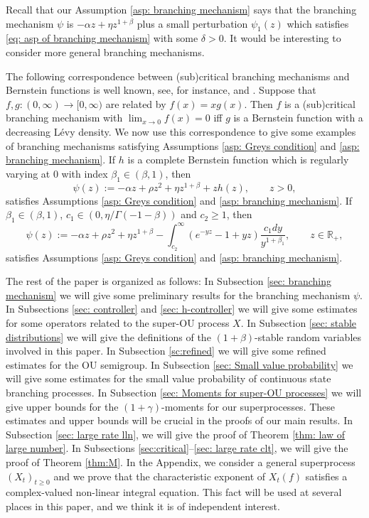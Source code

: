 \documentclass[EJP]{ejpecp} %
\begin{document}
	Recall that our Assumption \ref{asp: branching mechanism} says that the branching mechanism $\psi$ is $-\alpha z +\eta z^{1+\beta}$ plus a small perturbation $\psi_1(z)$ which satisfies \eqref{eq: asp of branching mechanism} with some $\delta>0$.
	It would be interesting to consider more general branching mechanisms.

	The following correspondence between (sub)critical branching mechanisms and Bernstein functions is well known, see, for instance, \cite[Theorem VII.4(ii)]{Bertoin} and \cite[Proposition 7]{BRY}.
	Suppose that $f, g:(0, \infty)\to [0, \infty)$ are related by $f(x)=xg(x)$.
	Then $f$ is a (sub)critical branching mechanism with $\lim_{x\to 0}f(x)=0$ iff $g$ is a Bernstein function with a decreasing L\'evy density.
	We now use this correspondence to give some examples of branching mechanisms satisfying Assumptions \ref{asp: Greys condition} and \ref{asp: branching mechanism}.
	If $h$ is a complete Bernstein function which is regularly varying at 0 with index $\beta_1\in (\beta, 1)$, then
\[
  	\psi(z)
  	:= -\alpha z + \rho z^2+\eta z^{1+\beta}+zh(z),
  	\qquad z>0,
\]
	satisfies Assumptions \ref{asp: Greys condition} and \ref{asp: branching mechanism}.
	If $\beta_1\in (\beta, 1)$, $c_1\in (0, \eta/\Gamma(-1-\beta))$ and $c_2\ge 1$, then
\[
  	\psi(z)
  	:=-\alpha z + \rho z^2+\eta z^{1+\beta}-\int^\infty_{c_2} (e^{-yz}-1+yz)\frac{c_1dy}{y^{1+\beta_1}},
  	\qquad z\in \mathbb R_+,
\]
	satisfies Assumptions \ref{asp: Greys condition} and \ref{asp: branching mechanism}.

	The rest of the paper is organized as follows:
	In Subsection \ref{sec: branching mechanism} we will give some preliminary results for the branching mechanism $\psi$.
	In Subsections \ref{sec: controller} and \ref{sec: h-controller} we will give some estimates for some operators related to the super-OU process $X$.
	In Subsection \ref{sec: stable distributions} we will give the definitions of the $(1+\beta)$-stable random variables involved in this paper.
	In Subsection \ref{sc:refined} we will give
	some refined estimates for the OU semigroup.
	In Subsection \ref{sec: Small value probability} we will give some estimates for the small value probability of continuous state branching processes.
	In Subsection \ref{sec: Moments for super-OU processes} we will give upper bounds for the $(1+\gamma)$-moments for our superprocesses.
	These estimates and upper bounds will be crucial in the proofs of our main results.
	In Subsection \ref{sec: large rate lln}, we will give the proof of Theorem \ref{thm: law of large number}.
	In Subsections \ref{sec:critical}--\ref{sec: large rate clt}, we will give the proof of Theorem \ref{thm:M}.
	In the Appendix, we consider a general superprocess $(X_t)_{t\geq 0}$ and we prove that the characteristic exponent of $X_t(f)$ satisfies a complex-valued non-linear integral equation.
	This fact will be used at several places in this paper, and we think it is of independent interest.
\end{document}

